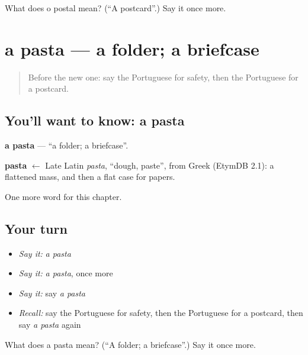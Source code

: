 \begin{tcolorbox}[breakable,colback=teal!4,colframe=teal!35!black,title={Before you move on}]
What does o postal mean? (\textquotedblleft{}A postcard\textquotedblright{}.) Say it once more.
\end{tcolorbox}
\section[a pasta]{a pasta — a folder; a briefcase}

\label{lesson:PT-C193-pasta}



\begin{quote}
Before the new one: say the Portuguese for safety, then the Portuguese for a postcard.
\end{quote}

\subsection*{You'll want to know: a pasta}
\textbf{a pasta} — \textquotedblleft{}a folder; a briefcase\textquotedblright{}.

\begin{cousinweb}
\textbf{pasta} $\leftarrow$ Late Latin \emph{pasta}, \textquotedblleft{}dough, paste\textquotedblright{}, from Greek (EtymDB 2.1): a flattened mass, and then a flat case for papers.
\end{cousinweb}

\begin{grammarlens}[title={What you've built}]
One more word for this chapter.
\end{grammarlens}

\subsection*{Your turn}
\begin{itemize}
\raggedright
  \item \emph{Say it:} \emph{a pasta}
  \item \emph{Say it:} \emph{a pasta}, once more
  \item \emph{Say it:} say \emph{a pasta}
  \item \emph{Recall:} say the Portuguese for safety, then the Portuguese for a postcard, then say \emph{a pasta} again
\end{itemize}

\begin{tcolorbox}[breakable,colback=teal!4,colframe=teal!35!black,title={Before you move on}]
What does a pasta mean? (\textquotedblleft{}A folder; a briefcase\textquotedblright{}.) Say it once more.
\end{tcolorbox}
